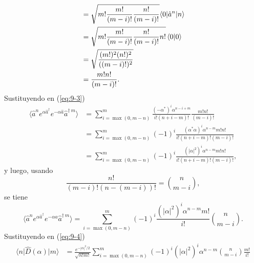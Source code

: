 \begin{enumerate}
\begin{align}
                                                                                                  & = \sqrt{m! \frac{m!}{(m-i)!} \frac{n!}{(m-i)!}} \langle 0 \vert \hat{a}^{n} \vert n\rangle                                    \nonumber                \\
                                                                                                  & = \sqrt{m! \frac{m!}{(m-i)!} \frac{n!}{(m-i)!} n!} \braket{0}{0}                                                              \nonumber                \\
                                                                                                  & = \sqrt{\frac{(m!)^2 (n!)^2}{((m-i)!)^2}}                                                                                     \nonumber                \\
                                                                                                  & = \frac{m!n!}{(m-i)!}.
        \end{align}
        Sustituyendo en (\ref{eq:9-3})
        \begin{align}
          \langle \hat{a}^{n} e^{\alpha\hat{a}^{\dagger}} e^{-\alpha \hat{a}} \hat{a}^{\dagger\,m} \rangle & = \sum_{i=\max(0,m-n)}^{m} \frac{(-\alpha^*)^{i} \alpha^{n-i+m}}{i! (n+i-m)!} \frac{m!n!}{(m-i)!}   \\
                                                                                                           & = \sum_{i=\max(0,m-n)}^{m} (-1)^{i} \frac{(\alpha^*\alpha)^{i} \alpha^{n-m} m!n!}{i!(n+i-m)!(m-i)!} \\
                                                                                                           & = \sum_{i=\max(0,m-n)}^{m} (-1)^{i} \frac{(|\alpha|^2)^{i} \alpha^{n-m} m!n!}{i!(n+i-m)!(m-i)!},
        \end{align}
        y luego, usando
        \begin{equation}
          \frac{n!}{(m-i)!(n-(m-i))!} = \binom{n }{m-i},
        \end{equation}
        se tiene
        \begin{equation}
          \langle \hat{a}^{n} e^{\alpha\hat{a}^{\dagger}} e^{-\alpha \hat{a}} \hat{a}^{\dagger\,m} \rangle = \sum_{i=\max(0,m-n)}^{m} (-1)^{i} \frac{(|\alpha|^2)^{i} \alpha^{n-m} m!}{i!} \binom{n }{m-i}.
        \end{equation}
        Sustituyendo en (\ref{eq:9-4})
        \begin{align}
          \langle n \vert \hat{D}(\alpha) \vert m \rangle & = \frac{e^{-|\alpha|^2/2}}{\sqrt{n!m!}} \sum_{i=\max(0, m-n)}^{m} (-1)^{i} (|\alpha|^2)^{i}\alpha^{n-m} \binom{n }{m-i}\frac{m!}{i!}    \\

\end{align}
\end{enumerate}
